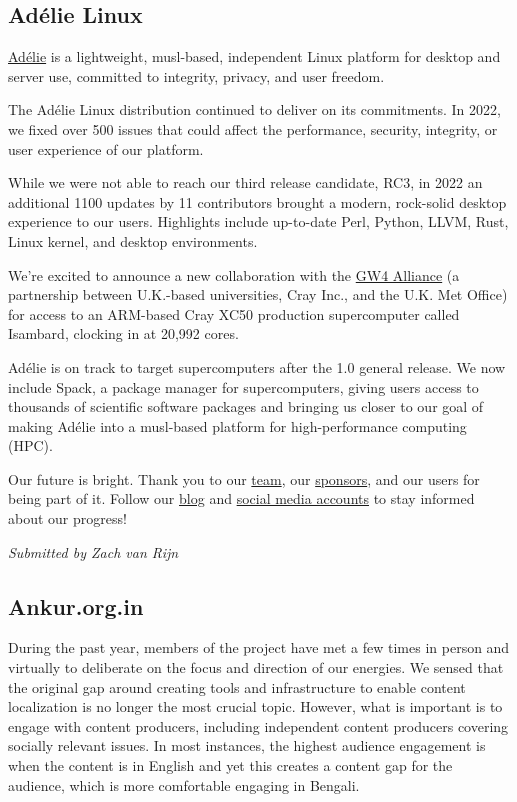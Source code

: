 \documentclass[a4paper]{report}
\begin{document}
\subsection{Adélie Linux}

\href{https://www.adelielinux.org/}{Adélie} is a lightweight, musl-based, independent Linux platform for desktop and server use, committed to integrity, privacy, and user freedom.

The Adélie Linux distribution continued to deliver on its commitments. In 2022, we fixed over 500 issues that could affect the performance, security, integrity, or user experience of our platform.

While we were not able to reach our third release candidate, RC3, in 2022 an additional 1100 updates by 11 contributors brought a modern, rock-solid desktop experience to our users. Highlights include up-to-date Perl, Python, LLVM, Rust, Linux kernel, and desktop environments.

We're excited to announce a new collaboration with the \href{https://gw4.ac.uk/news/new-strategic-partnership-launched-between-gw4-alliance-and-the-western-gateway/}{GW4 Alliance} (a partnership between U.K.-based universities, Cray Inc., and the U.K. Met Office) for access to an ARM-based Cray XC50 production supercomputer called Isambard, clocking in at 20,992 cores.

Adélie is on track to target supercomputers after the 1.0 general release. We now include Spack, a package manager for supercomputers, giving users access to thousands of scientific software packages and bringing us closer to our goal of making Adélie into a musl-based platform for high-performance computing (HPC).

Our future is bright. Thank you to our \href{https://git.adelielinux.org/groups/adelie/-/group_members}{team}, our \href{https://www.adelielinux.org/sponsors/}{sponsors}, and our users for being part of it. Follow our \href{https://blog.adelielinux.org/}{blog} and \href{https://www.adelielinux.org/contact/}{social media accounts} to stay informed about our progress!

{\em Submitted by Zach van Rijn}

\subsection{Ankur.org.in}

During the past year, members of the project have met a few times in person and virtually to deliberate on the focus and direction of our energies. We sensed that the original gap around creating tools and infrastructure to enable content localization is no longer the most crucial topic. However, what is important is to engage with content producers, including independent content producers covering socially relevant issues. In most instances, the highest audience engagement is when the content is in English and yet this creates a content gap for the audience, which is more comfortable engaging in Bengali.
\end{document}
